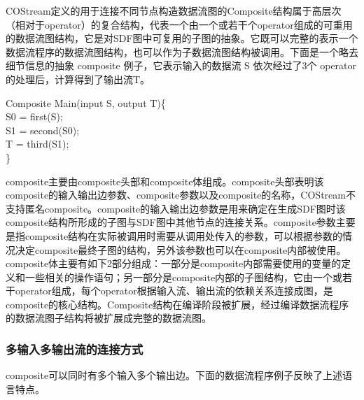 COStream定义的用于连接不同节点构造数据流图的Composite结构属于高层次（相对于operator）的复合结构，代表一个由一个或若干个operator组成的可重用的数据流图结构，它是对SDF图中可复用的子图的抽象。它既可以完整的表示一个数据流程序的数据流图结构，也可以作为子数据流图结构被调用。下面是一个略去细节信息的抽象 composite 例子，它表示输入的数据流 S 依次经过了3个 operator 的处理后，计算得到了输出流T。

\begin{algorithm}\label{algo:operator}
Composite Main(input S, output T)\{\\
 \hspace*{1 pc} S0 = first(S);\\
 \hspace*{1 pc} S1 = second(S0);\\
 \hspace*{1 pc} T  = third(S1);\\
\}
\end{algorithm}

composite主要由composite头部和composite体组成。composite头部表明该composite的输入输出边参数、composite参数以及composite的名称，COStream不支持匿名composite。composite的输入输出边参数是用来确定在生成SDF图时该composite结构所形成的子图与SDF图中其他节点的连接关系。composite参数主要是指composite结构在实际被调用时需要从调用处传入的参数，可以根据参数的情况决定composite最终子图的结构，另外该参数也可以在composite内部被使用。composite体主要有如下2部分组成：一部分是composite内部需要使用的变量的定义和一些相关的操作语句；另一部分是composite内部的子图结构，它由一个或若干operator组成，每个operator根据输入流、输出流的依赖关系连接成图，是composite的核心结构。Composite结构在编译阶段被扩展，经过编译数据流程序的数据流图子结构将被扩展成完整的数据流图。

\subsubsection{多输入多输出流的连接方式}

composite可以同时有多个输入多个输出边。下面的数据流程序例子反映了上述语言特点。

